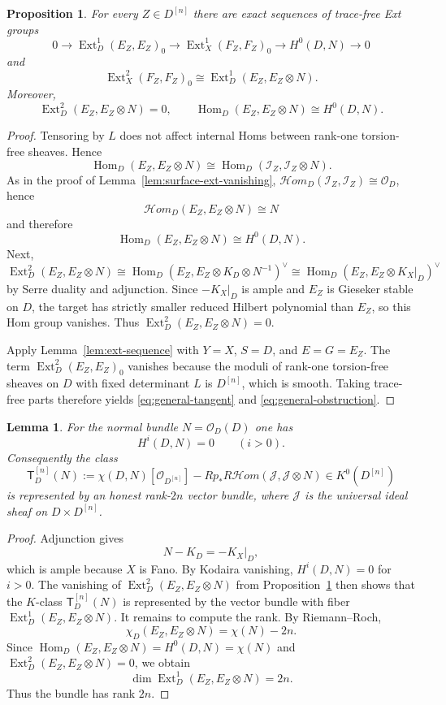 \documentclass[12pt]{amsart}
\numberwithin{equation}{section}
\newcommand{\OO}{\mathcal{O}}
\newcommand{\I}{\mathcal{I}}
\newcommand{\Ext}{\operatorname{Ext}}
\newcommand{\Hom}{\operatorname{Hom}}
\newcommand{\Ttw}{\mathsf{T}}
\newcommand{\dual}{\vee}
\theoremstyle{plain}
\newtheorem{proposition}[theorem]{Proposition}
\newtheorem{lemma}[theorem]{Lemma}
\theoremstyle{definition}
\theoremstyle{remark}
\begin{document}
\begin{proposition}\label{prop:general-ext}
For every $Z\in D^{[n]}$ there are exact sequences of trace-free Ext groups
\begin{equation}\label{eq:general-tangent}
0\longrightarrow \Ext^1_D(E_Z,E_Z)_0
\longrightarrow \Ext^1_X(F_Z,F_Z)_0
\longrightarrow H^0(D,N)
\longrightarrow 0
\end{equation}
and
\begin{equation}\label{eq:general-obstruction}
\Ext^2_X(F_Z,F_Z)_0\cong \Ext^1_D(E_Z,E_Z\otimes N).
\end{equation}
Moreover,
\[
\Ext^2_D(E_Z,E_Z\otimes N)=0,
\qquad
\Hom_D(E_Z,E_Z\otimes N)\cong H^0(D,N).
\]
\end{proposition}

\begin{proof}
Tensoring by $L$ does not affect internal Homs between rank-one torsion-free sheaves. Hence
\[
\Hom_D(E_Z,E_Z\otimes N)\cong \Hom_D(\I_Z,\I_Z\otimes N).
\]
As in the proof of Lemma~\ref{lem:surface-ext-vanishing}, $\mathcal Hom_D(\I_Z,\I_Z)\cong \OO_D$, hence
\[
\mathcal Hom_D(E_Z,E_Z\otimes N)\cong N
\]
and therefore
\[
\Hom_D(E_Z,E_Z\otimes N)\cong H^0(D,N).
\]
Next,
\[
\Ext^2_D(E_Z,E_Z\otimes N)
\cong
\Hom_D(E_Z,E_Z\otimes K_D\otimes N^{-1})^\dual
\cong
\Hom_D(E_Z,E_Z\otimes K_X|_D)^\dual
\]
by Serre duality and adjunction.
Since $-K_X|_D$ is ample and $E_Z$ is Gieseker stable on $D$, the target has strictly smaller reduced Hilbert polynomial than $E_Z$, so this Hom group vanishes.
Thus $\Ext^2_D(E_Z,E_Z\otimes N)=0$.

Apply Lemma~\ref{lem:ext-sequence} with $Y=X$, $S=D$, and $E=G=E_Z$.
The term $\Ext^2_D(E_Z,E_Z)_0$ vanishes because the moduli of rank-one torsion-free sheaves on $D$ with fixed determinant $L$ is $D^{[n]}$, which is smooth.
Taking trace-free parts therefore yields \eqref{eq:general-tangent} and \eqref{eq:general-obstruction}.
\end{proof}

\begin{lemma}\label{lem:kodaira-N}
For the normal bundle $N=\OO_D(D)$ one has
\[
H^i(D,N)=0\qquad (i>0).
\]
Consequently the class
\[
\Ttw_D^{[n]}(N):= \chi(D, N)[\mathcal{O}_{ D^{[n]} } ] - Rp_*R\mathcal Hom(\mathcal J,\mathcal J\otimes N)
\in K^0(D^{[n]})
\]
is represented by an honest rank-$2n$ vector bundle, where $\mathcal J$ is the universal ideal sheaf on $D\times D^{[n]}$.
\end{lemma}

\begin{proof}
Adjunction gives
\[
N-K_D=-K_X|_D,
\]
which is ample because $X$ is Fano.
By Kodaira vanishing, $H^i(D,N)=0$ for $i>0$.
The vanishing of $\Ext^2_D(E_Z,E_Z\otimes N)$ from Proposition~\ref{prop:general-ext} then shows that the $K$-class $\Ttw_D^{[n]}(N)$ is represented by the vector bundle with fiber $\Ext^1_D(E_Z,E_Z\otimes N)$.
It remains to compute the rank.
By Riemann--Roch,
\[
\chi_D(E_Z,E_Z\otimes N)=\chi(N)-2n.
\]
Since $\Hom_D(E_Z,E_Z\otimes N)=H^0(D,N)=\chi(N)$ and $\Ext^2_D(E_Z,E_Z\otimes N)=0$, we obtain
\[
\dim \Ext^1_D(E_Z,E_Z\otimes N)=2n.
\]
Thus the bundle has rank $2n$.
\end{proof}
\end{document}
